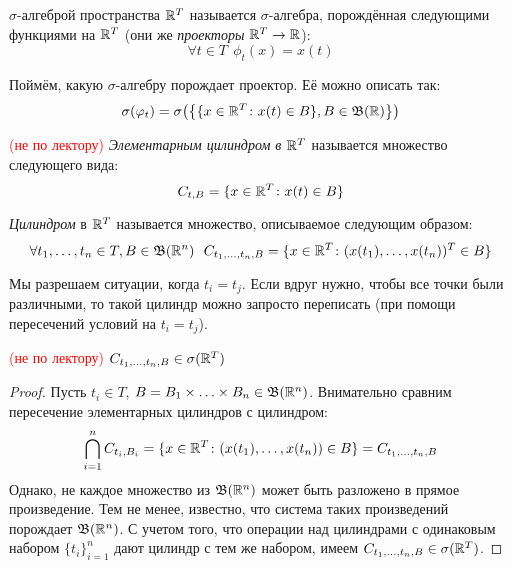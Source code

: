\begin{definition}
	$\sigma$-алгеброй пространства $\mathbb{R}^T$ называется $\sigma$-алгебра, порождённая следующими функциями на $\mathbb{R}^T$ (они же \textit{проекторы} $\mathbb{R}^T \to \mathbb{R}$):
	\[
		\forall t \in T\ \ \phi_t(x) = x(t)
	\]
\end{definition}

\begin{anote}
	Поймём, какую $\sigma$-алгебру порождает проектор. Её можно описать так:
	\[
		\sigma(\varphi_t) = \sigma\big(\big\{\{x \in \mathbb{R}^T \colon x(t) \in B\}, B \in \mathfrak{B}(\mathbb{R})\big\}\big)
	\]
\end{anote}

\begin{definition} \textcolor{red}{(не по лектору)}
	\textit{Элементарным цилиндром в $\mathbb{R}^T$} называется множество следующего вида:
	\[
		C_{t, B} = \{x \in \mathbb{R}^T \colon x(t) \in B\}
	\]
\end{definition}

\begin{definition}
	\textit{Цилиндром} в $\mathbb{R}^T$ называется множество, описываемое следующим образом:
	\[
		\forall t_1, \ldots, t_n \in T, B \in \B(\R^n)\ \ C_{t_1, \ldots, t_n, B} = \{x \in \R^T \colon (x(t_1), \ldots, x(t_n))^T \in B\}
	\]
\end{definition}

\begin{anote}
	Мы разрешаем ситуации, когда $t_i = t_j$. Если вдруг нужно, чтобы все точки были различными, то такой цилиндр можно запросто переписать (при помощи пересечений условий на $t_i = t_j$).
\end{anote}

\begin{proposition} \textcolor{red}{(не по лектору)}
	$C_{t_1, \ldots, t_n, B} \in \sigma(\mathbb{R}^T)$
\end{proposition}

\begin{proof}
	Пусть $t_i \in T$, $B = B_1 \times \ldots \times B_n \in \mathfrak{B}(\mathbb{R}^n)$. Внимательно сравним пересечение элементарных цилиндров с цилиндром:
	\[
		\bigcap_{i = 1}^n C_{t_i, B_i} = \{x \in \mathbb{R}^T \colon (x(t_1), \ldots, x(t_n)) \in B\} = C_{t_1, \ldots, t_n, B}
	\]
	Однако, не каждое множество из $\mathfrak{B}(\mathbb{R}^n)$ может быть разложено в прямое произведение. Тем не менее, известно, что система таких произведений порождает $\mathfrak{B}(\mathbb{R}^n)$. С учетом того, что операции над цилиндрами с одинаковым набором $\{t_i\}_{i = 1}^n$ дают цилиндр с тем же набором, имеем $C_{t_1, \ldots, t_n, B} \in \sigma(\mathbb{R}^T)$.
\end{proof}

